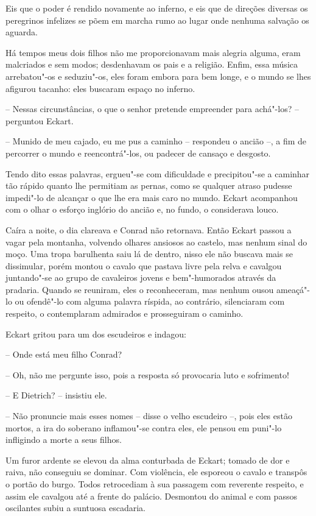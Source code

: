 Eis que o poder é rendido novamente ao inferno, e eis que de direções
diversas os peregrinos infelizes se põem em marcha rumo ao lugar onde
nenhuma salvação os aguarda.

Há tempos meus dois filhos não me proporcionavam mais alegria alguma,
eram malcriados e sem modos; desdenhavam os pais e a religião.
Enfim, essa música arrebatou"-os e seduziu"-os, eles foram embora para bem
longe, e o mundo se lhes afigurou tacanho: eles buscaram espaço no
inferno.

-- Nessas circunstâncias, o que o senhor pretende empreender para
achá"-los? -- perguntou Eckart.

-- Munido de meu cajado, eu me pus a caminho -- respondeu o ancião --, a fim
de percorrer o mundo e reencontrá"-los, ou padecer de cansaço e desgosto.

Tendo dito essas palavras, ergueu"-se com dificuldade e precipitou"-se a
caminhar tão rápido quanto lhe permitiam as pernas, como se qualquer
atraso pudesse impedi"-lo de alcançar o que lhe era mais caro no mundo.
Eckart acompanhou com o olhar o esforço inglório do ancião e, no fundo, o
considerava louco.

Caíra a noite, o dia clareava e Conrad não retornava. Então Eckart
passou a vagar pela montanha, volvendo olhares ansiosos ao castelo, mas
nenhum sinal do moço. Uma tropa barulhenta saiu lá de dentro, nisso ele
não buscava mais se dissimular, porém montou o cavalo que pastava livre
pela relva e cavalgou juntando"-se ao grupo de cavaleiros jovens e
bem"-humorados através da pradaria. Quando se reuniram, eles o
reconheceram, mas nenhum ousou ameaçá"-lo ou ofendê"-lo com alguma
palavra ríspida, ao contrário, silenciaram com respeito, o contemplaram
admirados e prosseguiram o caminho.

Eckart gritou para um dos escudeiros e indagou:

-- Onde está meu filho Conrad?

-- Oh, não me pergunte isso, pois a resposta só provocaria luto e
sofrimento!

-- E Dietrich? -- insistiu ele.

-- Não pronuncie mais esses nomes -- disse o velho escudeiro --, pois eles
estão mortos, a ira do soberano inflamou"-se contra eles, ele pensou em
puni"-lo infligindo a morte a seus filhos.

Um furor ardente se elevou da alma conturbada de Eckart; tomado de dor e
raiva, não conseguiu se dominar. Com violência, ele esporeou o cavalo e
transpôs o portão do burgo. Todos retrocediam à sua passagem com
reverente respeito, e assim ele cavalgou até a frente do palácio.
Desmontou do animal e com passos oscilantes subiu a suntuosa escadaria.

